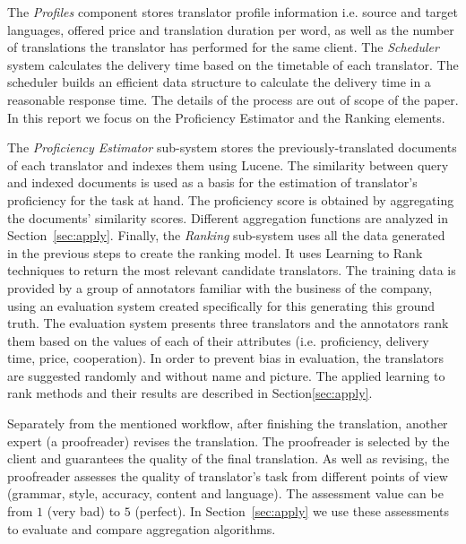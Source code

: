 The \textit{Profiles} component stores translator profile information i.e. source and target languages, offered price and translation duration per word, as well as the number of translations the translator has performed for the same client. The \textit{Scheduler} system calculates the delivery time based on the timetable of each translator. The scheduler builds an efficient data structure to calculate the delivery time in a reasonable response time. The details of the process are out of scope of the paper. In this report we focus on the Proficiency Estimator and the Ranking elements. 

The \textit{Proficiency Estimator} sub-system stores the previously-translated documents of each translator and indexes them using Lucene. The similarity between query and indexed documents is used as a basis for the estimation of translator's proficiency for the task at hand. The proficiency score is obtained by aggregating the documents' similarity scores. Different aggregation functions are analyzed in Section~\ref{sec:apply}. Finally, the \textit{Ranking} sub-system uses all the data generated in the previous steps to create the ranking model. It uses Learning to Rank techniques to return the most relevant candidate translators. The training data is provided by a group of annotators  familiar with the business of the company, using an evaluation system created specifically for this generating this ground truth. The evaluation system presents three translators and the annotators rank them based on the values of each of their attributes (i.e. proficiency, delivery time, price, cooperation). In order to prevent bias in evaluation, the translators are suggested randomly and without name and picture. The applied learning to rank methods and their results are described in Section\ref{sec:apply}. 


Separately from the mentioned workflow, after finishing the translation, another expert (a  proofreader) revises the translation. The proofreader is selected by the client and guarantees the quality of the final translation. As well as revising, the proofreader assesses the quality of translator's task from different points of view (grammar, style, accuracy, content and language). The assessment value can be from $1$ (very bad) to $5$ (perfect). In Section~\ref{sec:apply} we use these assessments to evaluate and compare aggregation algorithms.
